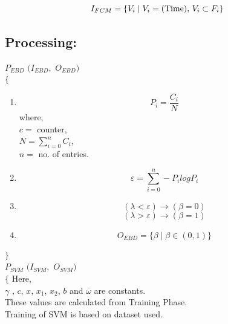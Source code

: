\documentclass[12pt,a4paper,final]{report}
\DeclareRobustCommand{\gobblefive}[5]{}
\newcommand*{\SkipTocEntry}{\addtocontents{toc}{\gobblefive}}
\begin{document}
{{{{{\setlength{\mathindent}{0cm}
\begin{equation}
I_{FCM} = \lbrace V_{i} \mid V_{i} = ($Time$),  $ $ V_{i}  \subset F_{i} \rbrace
\end{equation}



\SkipTocEntry\subsection{Processing:}
$P_{EBD} $ $ (I_{EBD},$ $O_{EBD})$\\
$\lbrace$

\begin{enumerate}

\item 
{\setlength{\mathindent}{0cm}}
\begin{equation}
P_{i} = \frac{C_{i}}{N}
\end{equation}
where, \\ $c =$ counter, \\ $N = \sum_{i=0}^{n} C_{i}$, \\ $n =$ no. of entries.

\item 
{\setlength{\mathindent}{0cm}}
\begin{equation}
\varepsilon = \sum_{i=0}^{n} - P_{i} log P_{i}
\end{equation}

\newpage
\item 
\begin{equation}
(\lambda < \varepsilon) \rightarrow (\beta = 0)
\end{equation}
\begin{equation}
(\lambda > \varepsilon) \rightarrow (\beta = 1)
\end{equation}

\item  
\begin{equation}
O_{EBD} = \lbrace \beta \mid \beta \in (0,1) \rbrace
\end{equation}

\end{enumerate}

\noindent
$\rbrace$
\\


\noindent
$P_{SVM} $ $ (I_{SVM},$ $O_{SVM})$\\
$\lbrace$
\indent
Here, \\
\indent $\gamma$ , $c$, $x$, $x_{1}$, $x_{2}$, $b$ and $\overline{\omega}$ are constants.\\
\indent These values are calculated from Training Phase.\\
\indent Training of SVM is based on dataset used.


}}}}}
\end{document}
